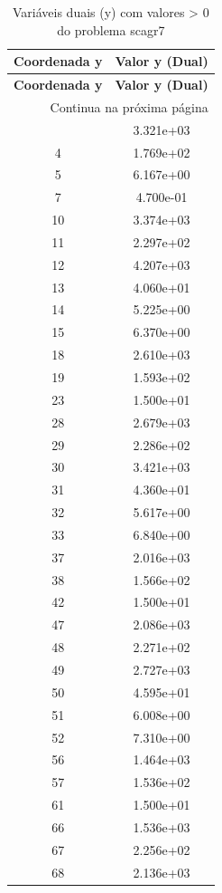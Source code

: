 \documentclass[12pt]{article}
\begin{document}
\begin{longtable}{@{}cc@{}}
\caption{Variáveis duais (y) com valores > 0 do problema scagr7} \\
\toprule
\textbf{Coordenada y} & \textbf{Valor y (Dual)} \\
\midrule
\endfirsthead

\toprule
\textbf{Coordenada y} & \textbf{Valor y (Dual)} \\
\midrule
\endhead

\midrule \multicolumn{2}{r}{{Continua na próxima página}} \\ \midrule
\endfoot

\bottomrule
\endlastfoot
3 & 3.321e+03 \\
4 & 1.769e+02 \\
5 & 6.167e+00 \\
7 & 4.700e-01 \\
10 & 3.374e+03 \\
11 & 2.297e+02 \\
12 & 4.207e+03 \\
13 & 4.060e+01 \\
14 & 5.225e+00 \\
15 & 6.370e+00 \\
18 & 2.610e+03 \\
19 & 1.593e+02 \\
23 & 1.500e+01 \\
28 & 2.679e+03 \\
29 & 2.286e+02 \\
30 & 3.421e+03 \\
31 & 4.360e+01 \\
32 & 5.617e+00 \\
33 & 6.840e+00 \\
37 & 2.016e+03 \\
38 & 1.566e+02 \\
42 & 1.500e+01 \\
47 & 2.086e+03 \\
48 & 2.271e+02 \\
49 & 2.727e+03 \\
50 & 4.595e+01 \\
51 & 6.008e+00 \\
52 & 7.310e+00 \\
56 & 1.464e+03 \\
57 & 1.536e+02 \\
61 & 1.500e+01 \\
66 & 1.536e+03 \\
67 & 2.256e+02 \\
68 & 2.136e+03 \\

\end{longtable}
\end{document}
